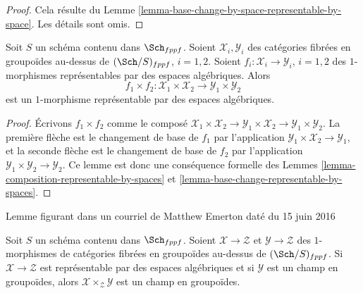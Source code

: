 \begin{proof}
Cela résulte du
Lemme \ref{lemma-base-change-by-space-representable-by-space}.
Les détails sont omis.
\end{proof}

\begin{lemma}
\label{lemma-product-representable-by-spaces}
Soit $S$ un schéma contenu dans $\Sch_{fppf}$.
Soient $\mathcal{X}_i, \mathcal{Y}_i$ des catégories fibrées en groupoïdes au-dessus de
$(\Sch/S)_{fppf}$, $i = 1, 2$.
Soient $f_i : \mathcal{X}_i \to \mathcal{Y}_i$, $i = 1, 2$
des $1$-morphismes représentables par des espaces algébriques.
Alors
$$
f_1 \times f_2 :
\mathcal{X}_1 \times \mathcal{X}_2
\longrightarrow
\mathcal{Y}_1 \times \mathcal{Y}_2
$$
est un $1$-morphisme représentable par des espaces algébriques.
\end{lemma}

\begin{proof}
Écrivons $f_1 \times f_2$ comme le composé
$\mathcal{X}_1 \times \mathcal{X}_2 \to
\mathcal{Y}_1 \times \mathcal{X}_2 \to
\mathcal{Y}_1 \times \mathcal{Y}_2$.
La première flèche est le changement de base de $f_1$ par l'application
$\mathcal{Y}_1 \times \mathcal{X}_2 \to \mathcal{Y}_1$, et la seconde flèche
est le changement de base de $f_2$ par l'application
$\mathcal{Y}_1 \times \mathcal{Y}_2 \to \mathcal{Y}_2$.
Ce lemme est donc une conséquence formelle des Lemmes
\ref{lemma-composition-representable-by-spaces}
et \ref{lemma-base-change-representable-by-spaces}.
\end{proof}

\begin{lemma}
\label{lemma-get-a-stack}
\begin{reference}
Lemme figurant dans un courriel de Matthew Emerton daté du 15 juin 2016
\end{reference}
Soit $S$ un schéma contenu dans $\Sch_{fppf}$.
Soient $\mathcal{X} \to \mathcal{Z}$ et $\mathcal{Y} \to \mathcal{Z}$
des $1$-morphismes de catégories fibrées en groupoïdes au-dessus de $(\Sch/S)_{fppf}$.
Si $\mathcal{X} \to \mathcal{Z}$ est représentable par des espaces algébriques
et si $\mathcal{Y}$ est un champ en groupoïdes, alors
$\mathcal{X} \times_\mathcal{Z} \mathcal{Y}$ est un champ en groupoïdes.
\end{lemma}

